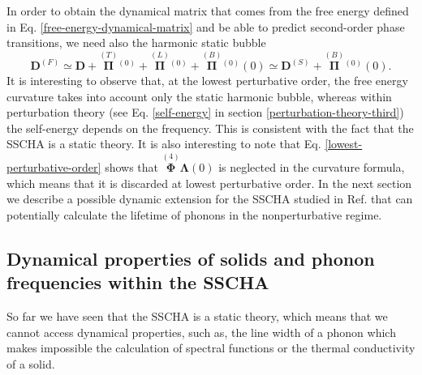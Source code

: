In order to obtain the dynamical matrix that comes from the free energy defined in Eq. \ref{free-energy-dynamical-matrix} and be able to predict second-order phase transitions, we need also the harmonic static bubble
\begin{equation}
 \label{lowest-perturbative-order}
 \mathbf{D}^{(F)}\simeq\mathbf{D}+\overset{(T)}{\boldsymbol{\Pi}}{}^{(0)}+\overset{(L)}{\boldsymbol{\Pi}}{}^{(0)}+\overset{(B)}{\boldsymbol{\Pi}}{}^{(0)}(0)\simeq\mathbf{D}^{(S)}+\overset{(B)}{\boldsymbol{\Pi}}{}^{(0)}(0).
\end{equation}  
It is interesting to observe that, at the lowest perturbative order, the free energy curvature takes into account only the static harmonic bubble, whereas within perturbation theory (see Eq. \ref{self-energy} 
in section \ref{perturbation-theory-third}) the self-energy depends on the frequency. This is consistent with the fact that the SSCHA is a static theory. It is also interesting to note 
that Eq. \ref{lowest-perturbative-order} shows that $\overset{(4)}{\boldsymbol{\Phi}}\boldsymbol{\Lambda}(0)$ is neglected in the curvature formula, which means that it is discarded at lowest perturbative order. 
In the next section we describe a possible dynamic extension for the SSCHA studied in Ref. \cite{bianco2017second} that can potentially calculate the lifetime of phonons in the nonperturbative regime.
 
\subsection{Dynamical properties of solids and phonon frequencies within the SSCHA}
\label{dynamical-sscha}

So far we have seen that the SSCHA is a static theory, which means that we cannot access dynamical properties, such as, the line width of a phonon which makes impossible the calculation of spectral functions or 
the thermal conductivity of a solid. \\


